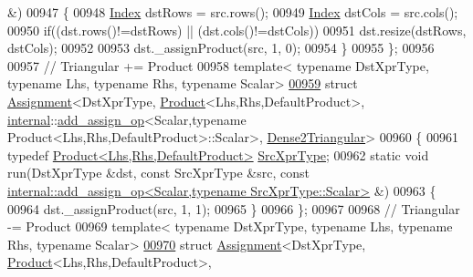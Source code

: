 \begin{DoxyCode}
       &)
00947   \{
00948     \hyperlink{namespace_eigen_a62e77e0933482dafde8fe197d9a2cfde}{Index} dstRows = src.rows();
00949     \hyperlink{namespace_eigen_a62e77e0933482dafde8fe197d9a2cfde}{Index} dstCols = src.cols();
00950     \textcolor{keywordflow}{if}((dst.rows()!=dstRows) || (dst.cols()!=dstCols))
00951       dst.resize(dstRows, dstCols);
00952 
00953     dst.\_assignProduct(src, 1, 0);
00954   \}
00955 \};
00956 
00957 \textcolor{comment}{// Triangular += Product}
00958 \textcolor{keyword}{template}< \textcolor{keyword}{typename} DstXprType, \textcolor{keyword}{typename} Lhs, \textcolor{keyword}{typename} Rhs, \textcolor{keyword}{typename} Scalar>
\hyperlink{struct_eigen_1_1internal_1_1_assignment_3_01_dst_xpr_type_00_01_product_3_01_lhs_00_01_rhs_00_01efc05729801ac09d27a309f4f0923f27}{00959} \textcolor{keyword}{struct }\hyperlink{struct_eigen_1_1internal_1_1_assignment}{Assignment}<DstXprType, \hyperlink{group___core___module_class_eigen_1_1_product}{Product}<Lhs,Rhs,DefaultProduct>, 
      \hyperlink{namespaceinternal}{internal}::\hyperlink{struct_eigen_1_1internal_1_1add__assign__op}{add\_assign\_op}<Scalar,typename Product<Lhs,Rhs,DefaultProduct>::Scalar>, 
      \hyperlink{struct_eigen_1_1internal_1_1_dense2_triangular}{Dense2Triangular}>
00960 \{
00961   \textcolor{keyword}{typedef} \hyperlink{group___core___module_class_eigen_1_1_product}{Product<Lhs,Rhs,DefaultProduct>} 
      \hyperlink{group___core___module_class_eigen_1_1_product}{SrcXprType};
00962   \textcolor{keyword}{static} \textcolor{keywordtype}{void} run(DstXprType &dst, \textcolor{keyword}{const} SrcXprType &src, \textcolor{keyword}{const} 
      \hyperlink{struct_eigen_1_1internal_1_1add__assign__op}{internal::add\_assign\_op<Scalar,typename SrcXprType::Scalar>}
       &)
00963   \{
00964     dst.\_assignProduct(src, 1, 1);
00965   \}
00966 \};
00967 
00968 \textcolor{comment}{// Triangular -= Product}
00969 \textcolor{keyword}{template}< \textcolor{keyword}{typename} DstXprType, \textcolor{keyword}{typename} Lhs, \textcolor{keyword}{typename} Rhs, \textcolor{keyword}{typename} Scalar>
\hyperlink{struct_eigen_1_1internal_1_1_assignment_3_01_dst_xpr_type_00_01_product_3_01_lhs_00_01_rhs_00_01bb8efed27d47832b53496ca7f6c9254b}{00970} \textcolor{keyword}{struct }\hyperlink{struct_eigen_1_1internal_1_1_assignment}{Assignment}<DstXprType, \hyperlink{group___core___module_class_eigen_1_1_product}{Product}<Lhs,Rhs,DefaultProduct>, 

\end{DoxyCode}
